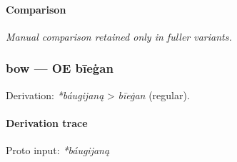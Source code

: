 \documentclass[
  british,
  a4paper,
]{article}
\begin{document}
\paragraph{Comparison}\label{comparison-3}

\emph{Manual comparison retained only in fuller variants.}

\subsubsection{bow --- OE bīeġan}\label{bow-oe-bux12beux121an-2}

Derivation: \emph{*báugijaną} \textgreater{} \emph{bīeġan} (regular).

\paragraph{Derivation trace}\label{derivation-trace-28}

Proto input: \emph{*báugijaną}

\begingroup
\setlength{\fboxsep}{6pt}
\end{document}
